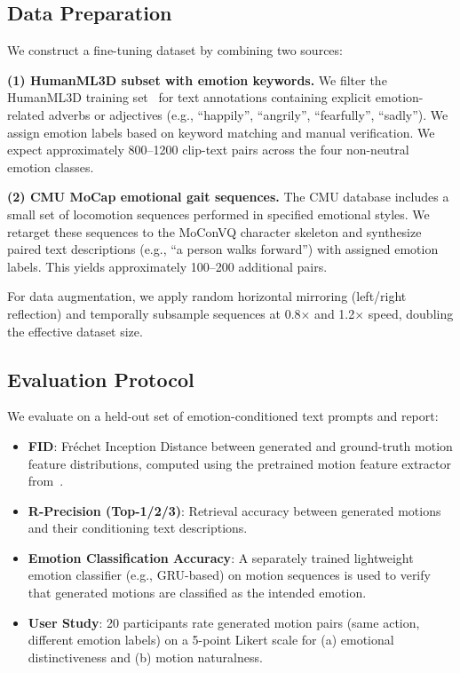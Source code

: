 \documentclass[conference]{IEEEtran}
\begin{document}
\subsection{Data Preparation}
 
We construct a fine-tuning dataset by combining two sources:
 
\textbf{(1) HumanML3D subset with emotion keywords.} We filter the HumanML3D training
set~\cite{guo2022generating} for text annotations containing explicit emotion-related
adverbs or adjectives (e.g., ``happily'', ``angrily'', ``fearfully'', ``sadly'').
We assign emotion labels based on keyword matching and manual verification. We expect
approximately 800--1200 clip-text pairs across the four non-neutral emotion classes.
 
\textbf{(2) CMU MoCap emotional gait sequences.} The CMU database includes a small
set of locomotion sequences performed in specified emotional styles. We retarget these
sequences to the MoConVQ character skeleton and synthesize paired text descriptions
(e.g., ``a person walks forward'') with assigned emotion labels. This yields
approximately 100--200 additional pairs.
 
For data augmentation, we apply random horizontal mirroring (left/right reflection)
and temporally subsample sequences at 0.8$\times$ and 1.2$\times$ speed, doubling
the effective dataset size.
 
\subsection{Evaluation Protocol}
 
We evaluate on a held-out set of emotion-conditioned text prompts and report:
 
\begin{itemize}[noitemsep]
    \item \textbf{FID}: Fr\'{e}chet Inception Distance between generated and
    ground-truth motion feature distributions, computed using the pretrained motion
    feature extractor from~\cite{guo2022generating}.
    \item \textbf{R-Precision (Top-1/2/3)}: Retrieval accuracy between generated
    motions and their conditioning text descriptions.
    \item \textbf{Emotion Classification Accuracy}: A separately trained lightweight
    emotion classifier (e.g., GRU-based) on motion sequences is used to verify that
    generated motions are classified as the intended emotion.
    \item \textbf{User Study}: 20 participants rate generated motion pairs
    (same action, different emotion labels) on a 5-point Likert scale for
    (a) emotional distinctiveness and (b) motion naturalness.
\end{itemize}
\end{document}
